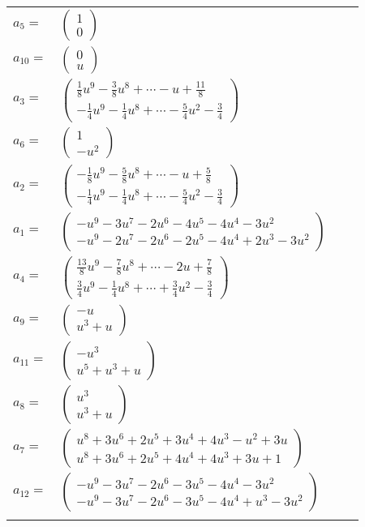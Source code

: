\documentclass[1p]{elsarticle_modified}
\theoremstyle{definition}
\begin{document}
\begin{tabular}{m{7pt} m{180pt} m{7pt} m{180pt} }
\flushright $a_{5}=$&$\begin{pmatrix}1\\0\end{pmatrix}$ \\
\flushright $a_{10}=$&$\begin{pmatrix}0\\u\end{pmatrix}$ \\
\flushright $a_{3}=$&$\begin{pmatrix}\frac{1}{8} u^9-\frac{3}{8} u^8+\cdots- u+\frac{11}{8}\\-\frac{1}{4} u^9-\frac{1}{4} u^8+\cdots-\frac{5}{4} u^2-\frac{3}{4}\end{pmatrix}$ \\
\flushright $a_{6}=$&$\begin{pmatrix}1\\- u^2\end{pmatrix}$ \\
\flushright $a_{2}=$&$\begin{pmatrix}-\frac{1}{8} u^9-\frac{5}{8} u^8+\cdots- u+\frac{5}{8}\\-\frac{1}{4} u^9-\frac{1}{4} u^8+\cdots-\frac{5}{4} u^2-\frac{3}{4}\end{pmatrix}$ \\
\flushright $a_{1}=$&$\begin{pmatrix}- u^9-3 u^7-2 u^6-4 u^5-4 u^4-3 u^2\\- u^9-2 u^7-2 u^6-2 u^5-4 u^4+2 u^3-3 u^2\end{pmatrix}$ \\
\flushright $a_{4}=$&$\begin{pmatrix}\frac{13}{8} u^9-\frac{7}{8} u^8+\cdots-2 u+\frac{7}{8}\\\frac{3}{4} u^9-\frac{1}{4} u^8+\cdots+\frac{3}{4} u^2-\frac{3}{4}\end{pmatrix}$ \\
\flushright $a_{9}=$&$\begin{pmatrix}- u\\u^3+u\end{pmatrix}$ \\
\flushright $a_{11}=$&$\begin{pmatrix}- u^3\\u^5+u^3+u\end{pmatrix}$ \\
\flushright $a_{8}=$&$\begin{pmatrix}u^3\\u^3+u\end{pmatrix}$ \\
\flushright $a_{7}=$&$\begin{pmatrix}u^8+3 u^6+2 u^5+3 u^4+4 u^3- u^2+3 u\\u^8+3 u^6+2 u^5+4 u^4+4 u^3+3 u+1\end{pmatrix}$ \\
\flushright $a_{12}=$&$\begin{pmatrix}- u^9-3 u^7-2 u^6-3 u^5-4 u^4-3 u^2\\- u^9-3 u^7-2 u^6-3 u^5-4 u^4+u^3-3 u^2\end{pmatrix}$\\&\end{tabular}
\end{document}
